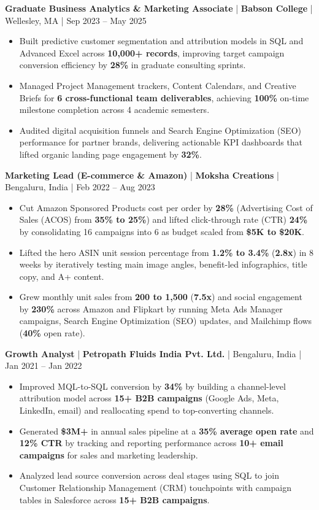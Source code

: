 \documentclass[10pt,letterpaper]{article}
\newcommand{\job}[4]{%
  \textbf{#1} \;|\; \textbf{#2} \;|\; #3 \;|\; #4\par%
}
\begin{document}
\job{Graduate Business Analytics \& Marketing Associate}{Babson College}{Wellesley, MA}{Sep 2023 -- May 2025}
\begin{itemize}
  \item Built predictive customer segmentation and attribution models in SQL and Advanced Excel across \textbf{10,000+ records}, improving target campaign conversion efficiency by \textbf{28\%} in graduate consulting sprints.
  \item Managed Project Management trackers, Content Calendars, and Creative Briefs for \textbf{6 cross-functional team deliverables}, achieving \textbf{100\%} on-time milestone completion across 4 academic semesters.
  \item Audited digital acquisition funnels and Search Engine Optimization (SEO) performance for partner brands, delivering actionable KPI dashboards that lifted organic landing page engagement by \textbf{32\%}.
\end{itemize}

\job{Marketing Lead (E-commerce \& Amazon)}{Moksha Creations}{Bengaluru, India}{Feb 2022 -- Aug 2023}
\begin{itemize}
  \item Cut Amazon Sponsored Products cost per order by \textbf{28\%} (Advertising Cost of Sales (ACOS) from \textbf{35\% to 25\%}) and lifted click-through rate (CTR) \textbf{24\%} by consolidating 16 campaigns into 6 as budget scaled from \textbf{\$5K to \$20K}.
  \item Lifted the hero ASIN unit session percentage from \textbf{1.2\% to 3.4\%} (\textbf{2.8x}) in 8 weeks by iteratively testing main image angles, benefit-led infographics, title copy, and A+ content.
  \item Grew monthly unit sales from \textbf{200 to 1,500} (\textbf{7.5x}) and social engagement by \textbf{230\%} across Amazon and Flipkart by running Meta Ads Manager campaigns, Search Engine Optimization (SEO) updates, and Mailchimp flows (\textbf{40\%} open rate).
\end{itemize}

\job{Growth Analyst}{Petropath Fluids India Pvt. Ltd.}{Bengaluru, India}{Jan 2021 -- Jan 2022}
\begin{itemize}
  \item Improved MQL-to-SQL conversion by \textbf{34\%} by building a channel-level attribution model across \textbf{15+ B2B campaigns} (Google Ads, Meta, LinkedIn, email) and reallocating spend to top-converting channels.
  \item Generated \textbf{\$3M+} in annual sales pipeline at a \textbf{35\% average open rate} and \textbf{12\% CTR} by tracking and reporting performance across \textbf{10+ email campaigns} for sales and marketing leadership.
  \item Analyzed lead source conversion across deal stages using SQL to join Customer Relationship Management (CRM) touchpoints with campaign tables in Salesforce across \textbf{15+ B2B campaigns}.
\end{itemize}
\end{document}
